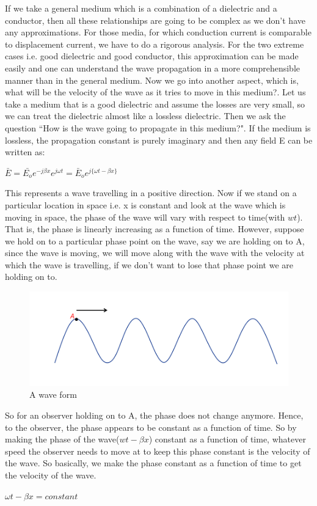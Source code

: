 If we take a general medium which is a combination of a dielectric and a conductor, then all these relationships are going to be complex as we don't have any approximations. For those media, for which conduction current is comparable to displacement current, we have to do a rigorous analysis. For the two extreme cases i.e. good dielectric and good conductor, this approximation can be made easily and one can understand the wave propagation in a more comprehensible manner than in the general medium.
Now we go into another aspect, which is, what will be the velocity of the wave as it tries to move in this medium?. Let us take a medium that is a good dielectric and assume the losses are very small, so we can treat the dielectric almost like a lossless dielectric. Then we ask the question ``How is the wave going to propagate in this medium?". If the medium is lossless, the propagation constant is purely imaginary and then any field E can be written as:
\begin{center}
$\bar{E}=\bar{E_{o}}e^{-j\beta x}e^{j\omega t}=\bar{E}_{o}e^{j\{\omega t-\beta x\}} $
\end{center}

This represents a wave travelling in a positive direction. Now if we stand on a particular location in space i.e. x is constant and look at the wave which is moving in space, the phase of the wave will vary with respect to time(with $wt$). That is, the phase is linearly increasing as a function of time. However, suppose we hold on to a particular phase point on the wave, say we are holding on to A, since the wave is moving, we will move along with the wave with the velocity at which the wave is travelling, if we don't want to lose that phase point we are holding on to.
\begin{figure}[h]
\centering
\includegraphics[width=1\linewidth]{./graphics/constant_phase}
\caption{A wave form}
\end{figure}

So for an observer holding on to A, the phase does not change anymore. Hence, to the observer, the phase appears to be constant as a function of time. So by making the phase of the wave($wt - \beta x$) constant as a function of time, whatever speed the observer needs to move at to keep this phase constant is the velocity of the wave. So basically, we make the phase constant as a function of time to get the velocity of the wave.
\begin{center}
$\omega t-\beta x = constant$
\end{center}

